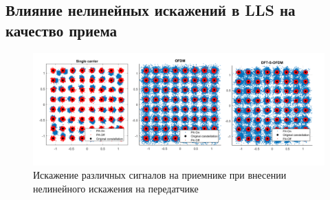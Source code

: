 





\subsection{Влияние нелинейных искажений в LLS на качество приема}

\begin{figure}[h!]
    \centering
    \includegraphics[width=0.95\linewidth]{figs/ofdm_pa_distortions.png}
    \caption{Искажение различных сигналов на приемнике при внесении нелинейного
    искажения на передатчике}
    \label{fig:lls_rapp_distortions}
\end{figure}




